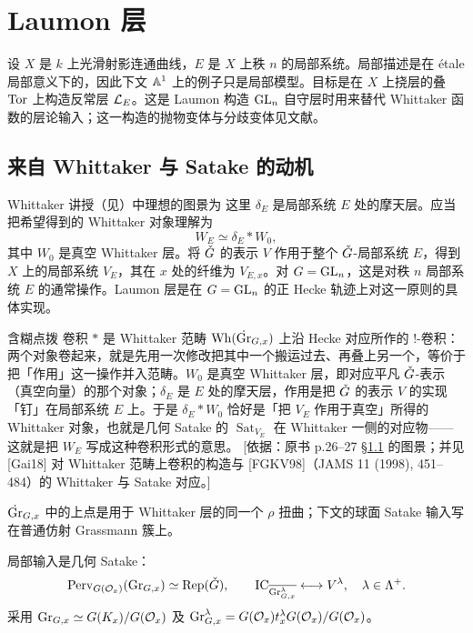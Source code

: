 \chapter{Laumon 层}\label{ch:4}
设 $X$ 是 $k$ 上光滑射影连通曲线，$E$ 是 $X$ 上秩 $n$ 的局部系统。局部描述是在 étale 局部意义下的，因此下文 $\mathbb{A}^1$ 上的例子只是局部模型。目标是在 $X$ 上挠层的叠 $\operatorname{Tor}$ 上构造反常层 $\mathcal{L}_E$。这是 Laumon 构造 $\operatorname{GL}_n$ 自守层时用来替代 Whittaker 函数的层论输入\cite{FGKV98}；这一构造的抛物变体与分歧变体见文献\cite{Hei04}。
\section{来自 Whittaker 与 Satake 的动机}\label{sec:4.1}
Whittaker 讲授（见）中理想的图景为
这里 $\delta_E$ 是局部系统 $E$ 处的摩天层。应当把希望得到的 Whittaker 对象理解为
\[W_E\simeq\delta_E*W_0,\]
其中 $W_0$ 是真空 Whittaker 层。将 $\check{G}$ 的表示 $V$ 作用于整个 $\check{G}$-局部系统 $E$，得到 $X$ 上的局部系统 $V_E$，其在 $x$ 处的纤维为 $V_{E,x}$。对 $G=\operatorname{GL}_n$，这是对秩 $n$ 局部系统 $E$ 的通常操作。Laumon 层是在 $G=\operatorname{GL}_n$ 的正 Hecke 轨迹上对这一原则的具体实现。

\begin{transnote}{含糊点拨}
卷积 $*$ 是 Whittaker 范畴 $\operatorname{Wh}(\dot{\operatorname{Gr}}_{G,x})$ 上沿 Hecke 对应所作的 $!$-卷积：两个对象卷起来，就是先用一次修改把其中一个搬运过去、再叠上另一个，等价于把「作用」这一操作并入范畴。$W_0$ 是真空 Whittaker 层，即对应平凡 $\check{G}$-表示（真空向量）的那个对象；$\delta_E$ 是 $E$ 处的摩天层，作用是把 $\check{G}$ 的表示 $V$ 的实现「钉」在局部系统 $E$ 上。于是 $\delta_E*W_0$ 恰好是「把 $V_E$ 作用于真空」所得的 Whittaker 对象，也就是几何 Satake 的 $\operatorname{Sat}_{V_E}$ 在 Whittaker 一侧的对应物——这就是把 $W_E$ 写成这种卷积形式的意思。
[依据：原书 p.26–27 \S\ref{sec:4.1} 的图景；并见 [Gai18] 对 Whittaker 范畴上卷积的构造与 [FGKV98]（JAMS 11 (1998), 451–484）的 Whittaker 与 Satake 对应。]
\end{transnote}$\dot{\operatorname{Gr}}_{G,x}$ 中的上点是用于 Whittaker 层的同一个 $\rho$ 扭曲；下文的球面 Satake 输入写在普通仿射 Grassmann 簇上。

局部输入是几何 Satake：
\[\operatorname{Perv}_{G(\mathcal{O}_x)}(\operatorname{Gr}_{G,x})\simeq\operatorname{Rep}(\check{G}),\qquad\operatorname{IC}_{\overline{\operatorname{Gr}_{G,x}^\lambda}}\longleftrightarrow V^\lambda,\quad\lambda\in\Lambda^+.\]
采用 $\operatorname{Gr}_{G,x}\simeq G(K_x)/G(\mathcal{O}_x)$ 及 $\operatorname{Gr}_{G,x}^\lambda=G(\mathcal{O}_x)t_x^\lambda G(\mathcal{O}_x)/G(\mathcal{O}_x)$。

